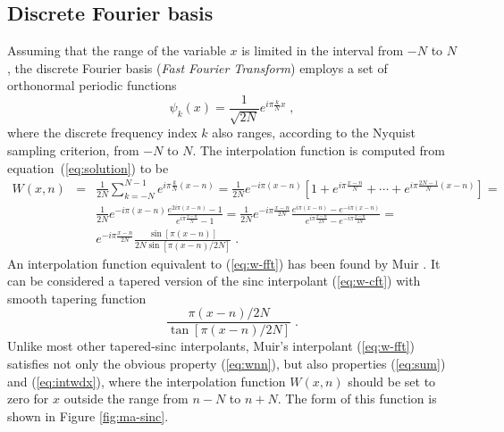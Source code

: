 

\subsection{Discrete Fourier basis}


Assuming that the range of the variable $x$ is limited in the interval
from $-N$ to $N$, the discrete Fourier basis (\emph{Fast Fourier
  Transform}) employs a set of orthonormal periodic functions
\begin{equation}\label{eq:fft}
  \psi_k (x) = \frac{1}{\sqrt{2N}} e^{i \pi \frac{k}{N} x} \;,
\end{equation}
where the discrete frequency index $k$ also ranges, according to the
Nyquist sampling criterion, from $-N$ to $N$. The interpolation
function is computed from equation~(\ref{eq:solution}) to be
\begin{eqnarray}\label{eq:w-fft}
  W (x, n) & = & \frac{1}{2 N} \sum_{k=-N}^{N-1} e^{i \pi \frac{k}{N} (x-n)} =
\frac{1}{2 N} e^{- i \pi (x-n)} \left[
  1 + e^{i \pi \frac{x-n}{N}} + \cdots +  e^{i \pi \frac{2N-1}{N} (x-n)}
\right] =  \nonumber \\
& & \frac{1}{2 N} e^{- i \pi (x-n)}
\frac{e^{2i \pi (x-n)} - 1}{e^{i \pi \frac{x-n}{N}} - 1} =
\frac{1}{2 N} e^{- i \pi \frac{x-n}{2 N}}
\frac{e^{i \pi (x-n)} - e^{-i \pi (x-n)}}{e^{i \pi \frac{x-n}{2 N}} -
e^{- i \pi \frac{x-n}{2 N}}} = \nonumber \\
& & e^{-i \pi \frac{x-n}{2 N}}
\frac{\sin \left[\pi (x - n)\right]}{2N \sin\left[\pi (x - n)/2N\right]} \;.
\end{eqnarray}
An interpolation function equivalent to (\ref{eq:w-fft}) has been
found by Muir \cite[]{Lin.sep.79.255,Popovici.sep.79.261,muir}. It can
be considered a tapered version of the sinc interpolant
(\ref{eq:w-cft}) with smooth tapering function
\[
\frac{\pi (x - n)/2N}{\tan\left[\pi (x - n)/2N\right]}\;.
\]
Unlike most other tapered-sinc interpolants, Muir's interpolant
(\ref{eq:w-fft}) satisfies not only the obvious property
(\ref{eq:wnn}), but also properties (\ref{eq:sum}) and
(\ref{eq:intwdx}), where the interpolation function $W (x,n)$ should
be set to zero for $x$ outside the range from $n - N$ to $n+N$. The
form of this function is shown in Figure \ref{fig:ma-sinc}.

